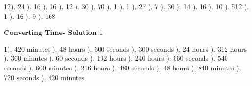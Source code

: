 \documentclass{article}%
\begin{document}
12). 24%
). 16%
). 16%
). 12%
). 30%
). 70%
). 1%
). 1%
). 27%
). 7%
). 30%
). 14%
). 16%
). 10%
). 512%
). 1%
). 16%
). 9%
). 168%
\newline%
\newpage%
\large%
\begin{center}%
\textbf{Converting Time- Solution 1}%
\newline%
\end{center} \normalsize%
1). 420 minutes%
). 48 hours%
). 600 seconds%
). 300 seconds%
). 24 hours%
). 312 hours%
). 360 minutes%
). 60 seconds%
). 192 hours%
). 240 hours%
). 660 seconds%
). 540 seconds%
). 600 minutes%
). 216 hours%
). 480 seconds%
). 48 hours%
). 840 minutes%
). 720 seconds%
). 420 minutes%
\newline%
\end{document}
